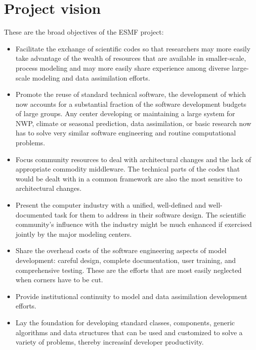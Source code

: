 \section{Project vision}
\label{sec:project_vision}

These are the broad objectives of the ESMF project:

\begin{itemize}
  
\item Facilitate the exchange of scientific codes so that researchers
  may more easily take advantage of the wealth of resources that are
  available in smaller-scale, process modeling and may more easily
  share experience among diverse large-scale modeling and data
  assimilation efforts.
  
\item Promote the reuse of standard technical software, the
  development of which now accounts for a substantial fraction of the
  software development budgets of large groups.  Any center developing
  or maintaining a large system for NWP, climate or seasonal
  prediction, data assimilation, or basic research now has to solve
  very similar software engineering and routine computational
  problems.
  
\item Focus community resources to deal with architectural changes and
  the lack of appropriate commodity middleware. The technical parts of
  the codes that would be dealt with in a common framework are also
  the most sensitive to architectural changes.
  
\item Present the computer industry with a unified, well-defined and
  well-documented task for them to address in their software design.
  The scientific community's influence with the industry might be much
  enhanced if exercised jointly by the major modeling centers.
  
\item Share the overhead costs of the software engineering aspects of
  model development: careful design, complete documentation, user
  training, and comprehensive testing. These are the efforts that are
  most easily neglected when corners have to be cut.
  
\item Provide institutional continuity to model and data assimilation
  development efforts.

\item Lay the foundation for developing standard classes, components, 
generic algorithms and data structures that can be used and customized
to solve a variety of problems, thereby increasinf developer productivity.

\end{itemize}

